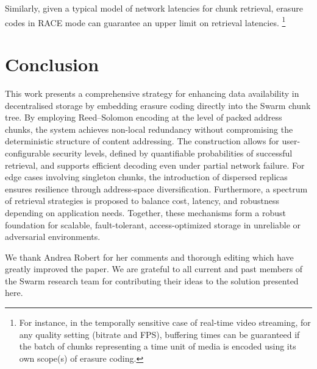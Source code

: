 \documentclass[manuscript,screen,review]{acmart}
\begin{document}
Similarly, given a typical model of network latencies for chunk retrieval, erasure codes in \textsc{RACE} mode can guarantee an upper limit on retrieval latencies.%
%
\footnote{For instance, in the temporally sensitive case of real-time video streaming, for any quality setting (bitrate and FPS), buffering times can be guaranteed if the batch of chunks representing a time unit of media is encoded using its own scope(s) of erasure coding.}


\section{Conclusion}\label{sec:conclusion}

This work presents a comprehensive strategy for enhancing data availability in decentralised storage by embedding erasure coding directly into the Swarm chunk tree. By employing Reed–Solomon encoding at the level of packed address chunks, the system achieves non-local redundancy without compromising the deterministic structure of content addressing. The construction allows for user-configurable security levels, defined by quantifiable probabilities of successful retrieval, and supports efficient decoding even under partial network failure. For edge cases involving singleton chunks, the introduction of dispersed replicas ensures resilience through address-space diversification. Furthermore, a spectrum of retrieval strategies is proposed to balance cost, latency, and robustness depending on application needs. Together, these mechanisms form a robust foundation for scalable, fault-tolerant, access-optimized storage in unreliable or adversarial environments.

\begin{acks}
We thank Andrea Robert for her comments and thorough editing which have greatly improved the paper. We are grateful to all current and past members of the Swarm research team for contributing their ideas to the solution presented here.
\end{acks}





\end{document}

